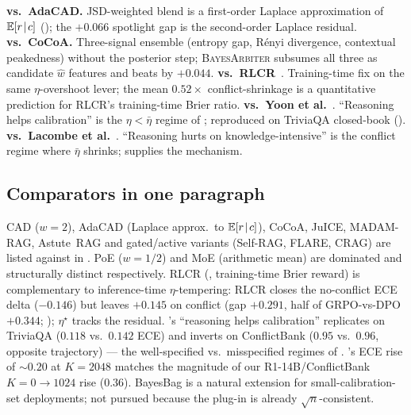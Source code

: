 \textbf{vs.\ AdaCAD.}  JSD-weighted blend is a first-order Laplace
approximation of $\mathbb{E}[r\!\mid\!c]$ (); the
$+0.066$ spotlight gap is the second-order Laplace residual.
\textbf{vs.\ CoCoA.}  Three-signal ensemble (entropy gap, R\'enyi
divergence, contextual peakedness) without the posterior step;
\textsc{BayesArbiter} subsumes all three as candidate $\hat w$ features and
beats by $+0.044$.
\textbf{vs.\ RLCR}~\citep{damani2025rlcr}.  Training-time fix on the
same $\eta$-overshoot lever; the mean $0.52\!\times$ conflict-shrinkage
is a quantitative prediction for RLCR's training-time Brier ratio.
\textbf{vs.\ Yoon et al.}~\citep{yoon2025confidence}.  ``Reasoning
helps calibration'' is the $\eta\!<\!\bar\eta$ regime of
; reproduced on TriviaQA closed-book
().
\textbf{vs.\ Lacombe et al.}~\citep{lacombe2025dontthinktwice}.
``Reasoning hurts on knowledge-intensive'' is the conflict regime
where $\bar\eta$ shrinks;  supplies the mechanism.


\subsection{Comparators in one paragraph}
\label{app:long-rw}
\label{app:bma}
\label{app:rlcr-detailed}
\label{app:yoon-detailed}
\label{app:lacombe-detailed}
\label{app:bagged-inference}

CAD ($w\!=\!2$), AdaCAD (Laplace approx.\ to $\mathbb{E}[r\!\mid\!c]$),
CoCoA, JuICE, MADAM-RAG, Astute~RAG and gated/active variants
(Self-RAG, FLARE, CRAG) are listed against 
in .  PoE ($w\!=\!1/2$) and MoE (arithmetic
mean) are dominated and structurally distinct respectively.  RLCR
(\citealp{damani2025rlcr}, training-time Brier reward) is
complementary to inference-time $\eta$-tempering: RLCR closes the
no-conflict ECE delta ($-0.146$) but leaves $+0.145$ on conflict
(gap $+0.291$, half of GRPO-vs-DPO $+0.344$;
); $\eta^\star$ tracks the
residual.  \citet{yoon2025confidence}'s ``reasoning helps
calibration'' replicates on TriviaQA ($0.118$ vs.\ $0.142$ ECE) and
inverts on ConflictBank ($0.95$ vs.\ $0.96$, opposite trajectory) ---
the well-specified vs.\ misspecified regimes of
.  \citet{lacombe2025dontthinktwice}'s ECE rise
of $\sim 0.20$ at $K\!=\!2048$ matches the magnitude of our
R1-14B/ConflictBank $K\!=\!0\!\to\!1024$ rise ($0.36$).  BayesBag
\citep{huggins2020bayesbag} is a natural extension for
small-calibration-set deployments; not pursued because the plug-in
is already $\sqrt n$-consistent.


